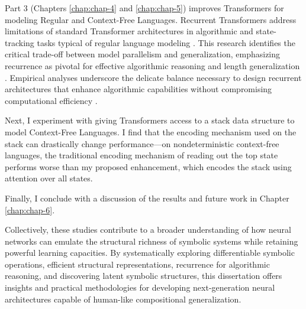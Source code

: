 Part 3 (Chapters \ref{chap:chap-4} and \ref{chap:chap-5}) improves Transformers for modeling Regular and Context-Free Languages. Recurrent Transformers address limitations of standard Transformer architectures in algorithmic and state-tracking tasks typical of regular language modeling \citep{deletang_neural_2022, merrill2024the}. This research identifies the critical trade-off between model parallelism and generalization, emphasizing recurrence as pivotal for effective algorithmic reasoning and length generalization \citep{soulos2024recurrent}. Empirical analyses underscore the delicate balance necessary to design recurrent architectures that enhance algorithmic capabilities without compromising computational efficiency \citep{ju_staircase_2022, hutchins_block-recurrent_2022}.

Next, I experiment with giving Transformers access to a stack data structure to model Context-Free Languages. I find that the encoding mechanism used on the stack can drastically change performance—on nondeterministic context-free languages, the traditional encoding mechanism of reading out the top state performs worse than my proposed enhancement, which encodes the stack using attention over all states.

Finally, I conclude with a discussion of the results and future work in Chapter \ref{chap:chap-6}. 

Collectively, these studies contribute to a broader understanding of how neural networks can emulate the structural richness of symbolic systems while retaining powerful learning capacities. By systematically exploring differentiable symbolic operations, efficient structural representations, recurrence for algorithmic reasoning, and discovering latent symbolic structures, this dissertation offers insights and practical methodologies for developing next-generation neural architectures capable of human-like compositional generalization.